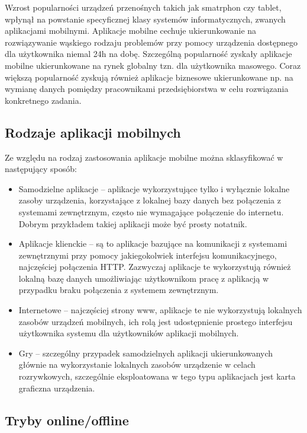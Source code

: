 Wzrost popularności urządzeń przenośnych takich jak smatrphon czy tablet, wpłynął na powstanie specyficznej klasy systemów informatycznych, zwanych aplikacjami mobilnymi. Aplikacje mobilne cechuje ukierunkowanie na rozwiązywanie wąskiego rodzaju problemów przy pomocy urządzenia dostępnego dla użytkownika niemal 24h na dobę. Szczególną popularność zyskały aplikacje mobilne ukierunkowane na rynek globalny tzn. dla użytkownika masowego. Coraz większą popularność zyskują również aplikacje biznesowe ukierunkowane np. na wymianę danych pomiędzy pracownikami przedsiębiorstwa w celu rozwiązania konkretnego zadania. 

\subsection{Rodzaje aplikacji mobilnych}
\label{sec:rodzajeAplikacjiMobilnych}

Ze względu na rodzaj zastosowania aplikacje mobilne można sklasyfikować w następujący sposób:

\begin{itemize}
\item Samodzielne aplikacje -- aplikacje wykorzystujące tylko i wyłącznie lokalne zasoby urządzenia, korzystające z lokalnej bazy danych bez połączenia z systemami zewnętrznym, często nie wymagające połączenie do internetu. Dobrym przykładem takiej aplikacji może być prosty notatnik.  
\item Aplikacje klienckie -- są to aplikacje bazujące na komunikacji z systemami zewnętrznymi przy pomocy jakiegokolwiek interfejsu komunikacyjnego,  najczęściej połączenia HTTP. Zazwyczaj aplikacje te wykorzystują również lokalną bazę danych umożliwiając użytkownikom pracę z aplikacją w przypadku braku połączenia z systemem zewnętrznym.
\item Internetowe -- najczęściej strony www, aplikacje  te nie wykorzystują lokalnych zasobów urządzeń mobilnych, ich rolą jest udostępnienie prostego interfejsu użytkownika systemu dla użytkowników aplikacji mobilnych.
\item Gry  -- szczególny przypadek samodzielnych aplikacji ukierunkowanych głównie na wykorzystanie lokalnych zasobów urządzenie w celach rozrywkowych, szczególnie eksploatowana w tego typu aplikacjach jest karta graficzna urządzenia.
\end{itemize}

\subsection{Tryby online/offline}
\label{sec:trybyAplikacjiMobilnych}

